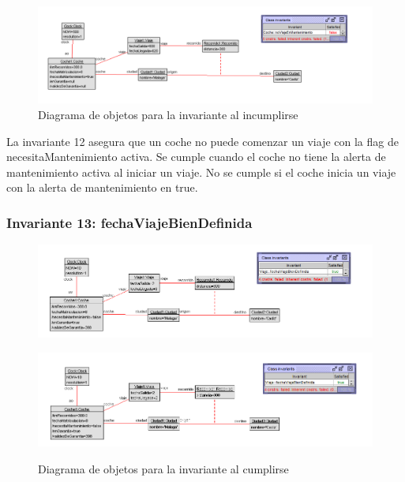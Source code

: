 \documentclass[12pt.a4paper]{article}
\begin{document}
\begin{figure}[H]
     \includegraphics[width=1\linewidth]{Soils/12_v2.png}
     \caption{Diagrama de objetos para la invariante al incumplirse}
     \label{Diagrama del sistema de aviacion}
\end{figure}

La invariante 12 asegura que un coche no puede comenzar un viaje con la flag de necesitaMantenimiento activa. Se cumple cuando el coche no tiene la alerta de mantenimiento activa al iniciar un viaje. No se cumple si el coche inicia un viaje con la alerta de mantenimiento en true.

\subsubsection{Invariante 13: fechaViajeBienDefinida}
\begin{figure}[H]
        \begin{minipage}{0.49\textwidth}
            \centering
            \includegraphics[width=1\linewidth]{Soils/13.png}
        \end{minipage}
        \hfill
        \begin{minipage}{0.49\textwidth}
        \centering
        \includegraphics[width=1\linewidth]{Soils/13_v2.png}
        \label{fig:diagrama2}
    \end{minipage}
            \caption{Diagrama de objetos para la invariante al cumplirse}
         \label{Diagrama_cumplimiento}
\end{figure}
\end{document}
